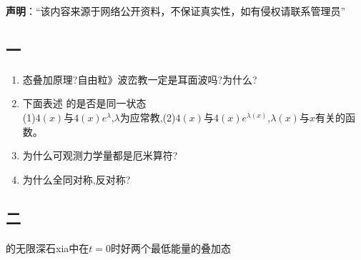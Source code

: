 
\textbf{声明}：“该内容来源于网络公开资料，不保证真实性，如有侵权请联系管理员”

\subsection{一}
\begin{enumerate}
\item 态叠加原理?自由粒》波峦教一定是耳面波吗?为什么?
\item 下面表述 的是否是同一状态\\
(1)$4(x)$与$4(x)e^\lambda$,$\lambda$为应常教,(2)$4(x)$与$4(x)e^{\lambda(x)}$,$\lambda(x)$与$x$有关的函数。
\item 为什么可观测力学量都是厄米算符?
\item 为什么全同对称,反对称?
\end{enumerate}
\subsection{二}
的无限深石xia中在$t=0$时好两个最低能量的叠加态